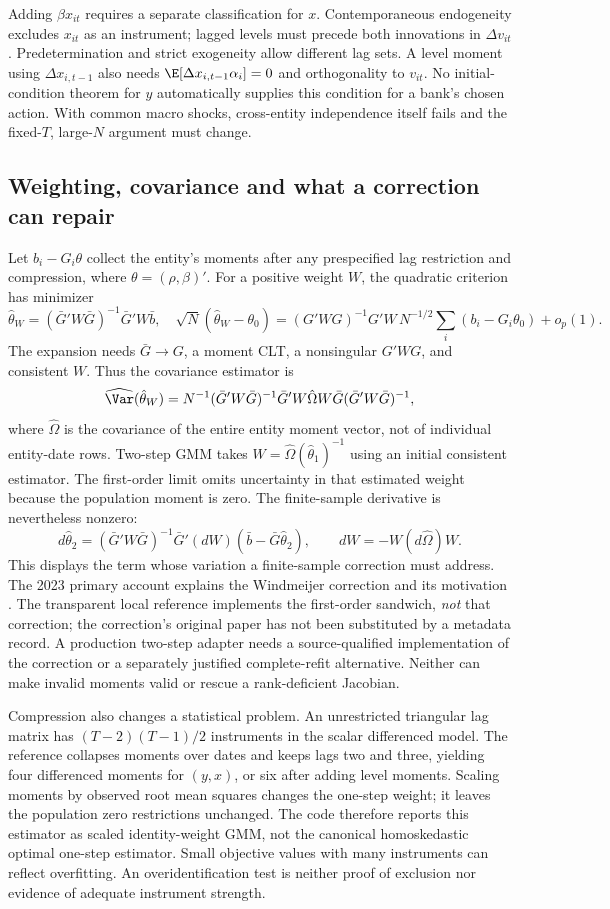 Adding $\beta x_{it}$ requires a separate classification for $x$.
Contemporaneous endogeneity excludes $x_{it}$ as an instrument; lagged levels
must precede both innovations in $\Delta v_{it}$. Predetermination and strict
exogeneity allow different lag sets. A level moment using $\Delta x_{i,t-1}$
also needs $\E[\Delta x_{i,t-1}\alpha_i]=0$ and orthogonality to $v_{it}$.
No initial-condition theorem for $y$ automatically supplies this condition
for a bank's chosen action. With common macro shocks, cross-entity
independence itself fails and the fixed-$T$, large-$N$ argument must change.

\subsection{Weighting, covariance and what a correction can repair}
Let $b_i-G_i\theta$ collect the entity's moments after any prespecified lag
restriction and compression, where $\theta=(\rho,\beta)'$. For a positive
weight $W$, the quadratic criterion has minimizer
\[
 \hat\theta_W=(\bar G'W\bar G)^{-1}\bar G'W\bar b,
 \quad
 \sqrt N(\hat\theta_W-\theta_0)=
 (G'WG)^{-1}G'W\,N^{-1/2}\sum_i(b_i-G_i\theta_0)+o_p(1).
\]
The expansion needs $\bar G\to G$, a moment CLT, a nonsingular $G'WG$,
and consistent $W$. Thus the covariance estimator is
\[
 \widehat{\Var}(\hat\theta_W)=N^{-1}
 (\bar G'W\bar G)^{-1}\bar G'W\hat\Omega W\bar G
 (\bar G'W\bar G)^{-1},
\]
where $\hat\Omega$ is the covariance of the entire entity moment vector,
not of individual entity-date rows. Two-step GMM takes
$W=\hat\Omega(\hat\theta_1)^{-1}$ using an initial consistent estimator.
The first-order limit omits uncertainty in that estimated weight because
the population moment is zero. The finite-sample derivative is nevertheless
nonzero:
\[
 d\hat\theta_2=(\bar G'W\bar G)^{-1}\bar G'(dW)
 (\bar b-\bar G\hat\theta_2),\qquad
 dW=-W(d\hat\Omega)W.
\]
This displays the term whose variation a finite-sample correction must
address. The 2023 primary account explains the Windmeijer correction and its
motivation \citep[Section 2.3, p.105]{blundellbond2023}. The transparent local
reference implements the first-order sandwich, \emph{not} that correction;
the correction's original paper has not been substituted by a metadata record.
A production two-step adapter needs a source-qualified implementation of the
correction or a separately justified complete-refit alternative. Neither can
make invalid moments valid or rescue a rank-deficient Jacobian.

Compression also changes a statistical problem. An unrestricted triangular
lag matrix has $(T-2)(T-1)/2$ instruments in the scalar differenced model.
The reference collapses moments over dates and keeps lags two and three,
yielding four differenced moments for $(y,x)$, or six after adding level
moments. Scaling moments by observed root mean squares changes the one-step
weight; it leaves the population zero restrictions unchanged. The code
therefore reports this estimator as scaled identity-weight GMM, not the
canonical homoskedastic optimal one-step estimator. Small objective values
with many instruments can reflect overfitting. An overidentification test
is neither proof of exclusion nor evidence of adequate instrument strength.

